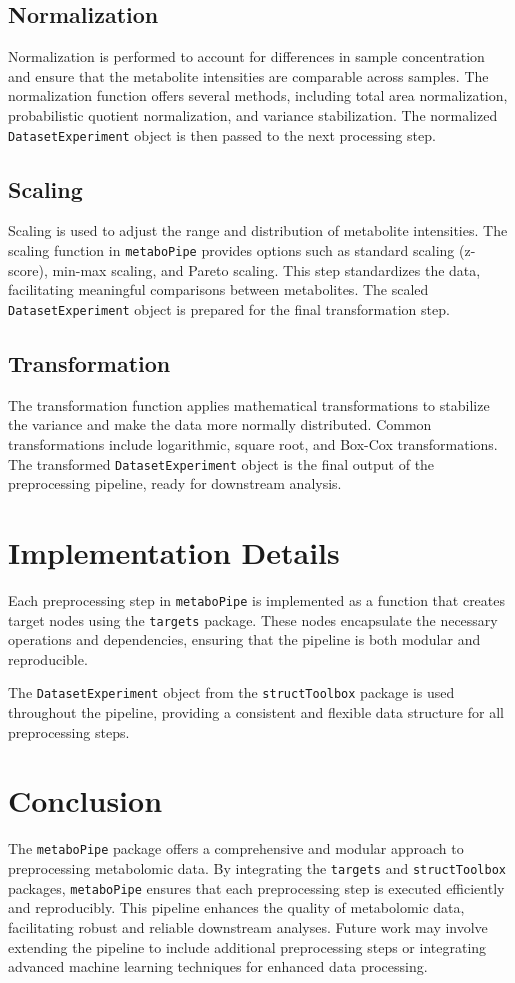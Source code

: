 \documentclass[ENG, BIB]{TFUOC}%
\begin{document}
\subsection{Normalization} 
Normalization is performed to account for differences in sample concentration and ensure that the metabolite intensities are comparable across samples. The normalization function offers several methods, including total area normalization, probabilistic quotient normalization, and variance stabilization. The normalized \texttt{DatasetExperiment} object is then passed to the next processing step.


\subsection{Scaling} 
Scaling is used to adjust the range and distribution of metabolite intensities. The scaling function in \texttt{metaboPipe} provides options such as standard scaling (z-score), min-max scaling, and Pareto scaling. This step standardizes the data, facilitating meaningful comparisons between metabolites. The scaled \texttt{DatasetExperiment} object is prepared for the final transformation step. 

\subsection{Transformation} 
The transformation function applies mathematical transformations to stabilize the variance and make the data more normally distributed. Common transformations include logarithmic, square root, and Box-Cox transformations. The transformed \texttt{DatasetExperiment} object is the final output of the preprocessing pipeline, ready for downstream analysis. 

\section{Implementation Details}
Each preprocessing step in \texttt{metaboPipe} is implemented as a function that creates target nodes using the \texttt{targets} package. These nodes encapsulate the necessary operations and dependencies, ensuring that the pipeline is both modular and reproducible. 

The \texttt{DatasetExperiment} object from the \texttt{structToolbox} package is used throughout the pipeline, providing a consistent and flexible data structure for all preprocessing steps.


\section{Conclusion} 
The \texttt{metaboPipe} package offers a comprehensive and modular approach to preprocessing metabolomic data. By integrating the \texttt{targets} and \texttt{structToolbox} packages, \texttt{metaboPipe} ensures that each preprocessing step is executed efficiently and reproducibly. This pipeline enhances the quality of metabolomic data, facilitating robust and reliable downstream analyses. Future work may involve extending the pipeline to include additional preprocessing steps or integrating advanced machine learning techniques for enhanced data processing.
\end{document}

